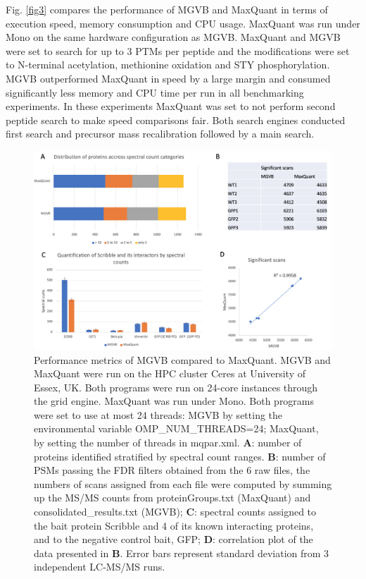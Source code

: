 \documentclass[default]{sn-jnl}
\theoremstyle{thmstyleone}%
\theoremstyle{thmstyletwo}%
\theoremstyle{thmstylethree}%
\begin{document}
Fig. \ref {fig3} compares the performance of MGVB and MaxQuant in terms of execution speed, memory consumption and CPU usage. MaxQuant was run under Mono on the same hardware configuration as MGVB. MaxQuant and MGVB were set to search for up to 3 PTMs per peptide and the modifications were set to N-terminal acetylation, methionine oxidation and STY phosphorylation. MGVB outperformed MaxQuant in speed by a large margin and consumed significantly less memory and CPU time per run in all benchmarking experiments. In these experiments MaxQuant was set to not perform second peptide search to make speed comparisons fair. Both search engines conducted first search and precursor mass recalibration followed by a main search.


\begin{figure}[H]
\centering
\includegraphics[width=1\textwidth]{mgvb_fig2.png}
\caption{Performance metrics of MGVB compared to MaxQuant. MGVB and MaxQuant were run on the HPC cluster Ceres at University of Essex, UK. Both programs were run on 24-core instances through the grid engine. MaxQuant was run under Mono. Both programs were set to use at most 24 threads: MGVB by setting the environmental variable OMP\_NUM\_THREADS=24; MaxQuant, by setting the number of threads in mqpar.xml. \textbf{A}: number of proteins identified stratified by spectral count ranges. \textbf{B}: number of PSMs passing the FDR filters obtained from the 6 raw files, the numbers of scans assigned from each file were computed by summing up the MS/MS counts from proteinGroups.txt (MaxQuant) and consolidated\_results.txt (MGVB); \textbf{C}: spectral counts assigned to the bait protein Scribble and 4 of its known interacting proteins, and to the negative control bait, GFP; \textbf{D}: correlation plot of the data presented in  \textbf{B}. Error bars represent standard deviation from 3 independent LC-MS/MS runs.}\label{fig2}
\end{figure}
\end{document}
